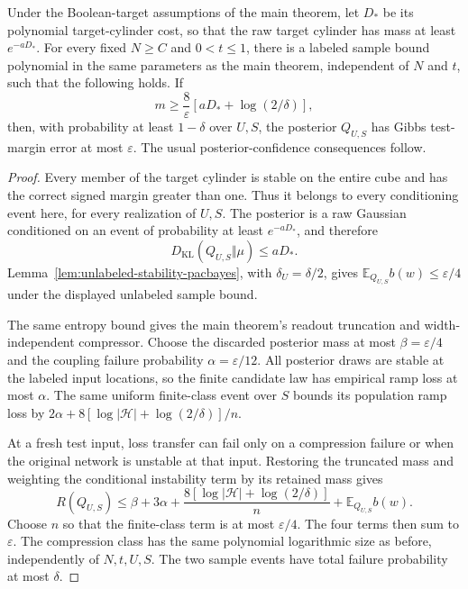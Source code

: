 \begin{theorem}
\label{thm:unlabeled-stability-pool}
Under the Boolean-target assumptions of the main theorem, let $D_*$
be its polynomial target-cylinder cost, so that the raw target cylinder
has mass at least $e^{-aD_*}$. For every fixed $N\ge C$ and
$0<t\le1$, there is a labeled sample bound polynomial in the same
parameters as the main theorem, independent of $N$ and $t$, such that
the following holds. If
\[
 m\ge\frac8\varepsilon
       \left[aD_*+\log(2/\delta)\right],
\]
then, with probability at least $1-\delta$ over $U,S$, the posterior
$Q_{U,S}$ has Gibbs test-margin error at most $\varepsilon$.
The usual posterior-confidence consequences follow.
\end{theorem}

\begin{proof}
Every member of the target cylinder is stable on the entire cube
and has the correct signed margin greater than one. Thus it belongs
to every conditioning event here, for every realization of $U,S$.
The posterior is a raw Gaussian conditioned on an event of probability
at least $e^{-aD_*}$, and therefore
\[
 D_{\mathrm{KL}}(Q_{U,S}\Vert\mu)\le aD_*.
\]
Lemma~\ref{lem:unlabeled-stability-pacbayes}, with
$\delta_U=\delta/2$, gives
$\mathbb E_{Q_{U,S}}b(w)\le\varepsilon/4$ under the displayed
unlabeled sample bound.

The same entropy bound gives the main theorem's readout truncation
and width-independent compressor. Choose the discarded posterior
mass at most $\beta=\varepsilon/4$ and the coupling failure probability
$\alpha=\varepsilon/12$. All posterior draws are stable at the labeled
input locations, so the finite candidate law has empirical ramp loss
at most $\alpha$. The same uniform finite-class event over $S$ bounds
its population ramp loss by
$2\alpha+8[\log|\mathcal H|+\log(2/\delta)]/n$.

At a fresh test input, loss transfer can fail only on a compression
failure or when the original network is unstable at that input.
Restoring the truncated mass and weighting the conditional instability
term by its retained mass gives
\[
 R(Q_{U,S})\le
 \beta+3\alpha+
 \frac{8[\log|\mathcal H|+\log(2/\delta)]}{n}
 +\mathbb E_{Q_{U,S}}b(w).
\]
Choose $n$ so that the finite-class term is at most $\varepsilon/4$.
The four terms then sum to $\varepsilon$. The compression class has
the same polynomial logarithmic size as before, independently of
$N,t,U,S$. The two sample events have total failure probability at
most $\delta$.
\end{proof}


